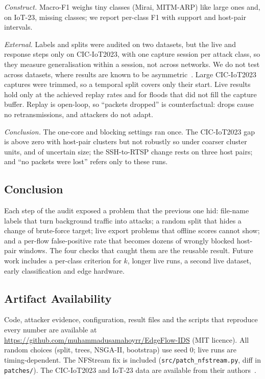 \emph{Construct.} Macro-F1 weighs tiny classes (Mirai, MITM-ARP) like large ones and, on IoT-23, missing classes; we report per-class F1 with support and host-pair intervals.

\emph{External.} Labels and splits were audited on two datasets, but the live and response steps only on CIC-IoT2023, with one capture session per attack class, so they measure generalisation within a session, not across networks. We do not test across datasets, where results are known to be asymmetric~\cite{ali2026siamxbert}. Large CIC-IoT2023 captures were trimmed, so a temporal split covers only their start. Live results hold only at the achieved replay rates and for floods that did not fill the capture buffer. Replay is open-loop, so ``packets dropped'' is counterfactual: drops cause no retransmissions, and attackers do not adapt.

\emph{Conclusion.} The one-core and blocking settings ran once. The CIC-IoT2023 gap is above zero with host-pair clusters but not robustly so under coarser cluster units, and of uncertain size; the SSH-to-RTSP change rests on three host pairs; and ``no packets were lost'' refers only to these runs.

\subsection{Conclusion}

Each step of the audit exposed a problem that the previous one hid: file-name labels that turn background traffic into attacks; a random split that hides a change of brute-force target; live export problems that offline scores cannot show; and a per-flow false-positive rate that becomes dozens of wrongly blocked host-pair windows. The four checks that caught them are the reusable result. Future work includes a per-class criterion for $k$, longer live runs, a second live dataset, early classification and edge hardware.

\subsection{Artifact Availability}

Code, attacker evidence, configuration, result files and the scripts that reproduce every number are available at \url{https://github.com/muhammadusamahoyrr/EdgeFlow-IDS} (MIT licence). All random choices (split, trees, NSGA-II, bootstrap) use seed 0; live runs are timing-dependent. The NFStream fix is included (\nolinkurl{src/patch_nfstream.py}, diff in \nolinkurl{patches/}).
The CIC-IoT2023 and IoT-23 data are available from their authors~\cite{neto2023ciciot2023,garcia2020iot23}.
